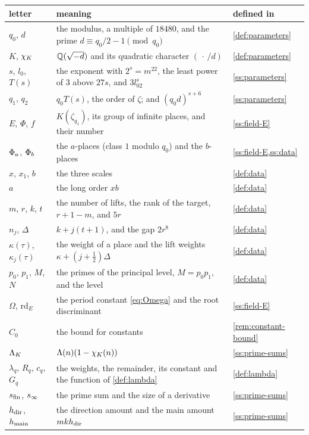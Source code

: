 \begin{longtable}{@{}>{\raggedright\arraybackslash}p{}>{\raggedright\arraybackslash}p{}>{\raggedright\arraybackslash}p{}@{}}
\toprule
letter & meaning & defined in\\
\midrule\endhead
$q_0$, $d$ & the modulus, a multiple of $18480$, and the prime $d\equiv q_0/2-1\pmod{q_0}$ & \cref{def:parameters}\\
$K$, $\chi_K$ & $\mathbb{Q}(\sqrt{-d})$ and its quadratic character $(\,\cdot\,/d)$ & \cref{def:parameters}\\
$s$, $l_0$, $T(s)$ & the exponent with $2^s=m^{22}$, the least power of $3$ above $27s$, and $3l_02^s$ & \cref{ss:parameters}\\
$q_1$, $q_2$ & $q_0T(s)$, the order of $\zeta$; and $(q_0d)^{s+6}$ & \cref{ss:parameters}\\
$E$, $\Phi$, $f$ & $K(\zeta_{q_1})$, its group of infinite places, and their number & \cref{ss:field-E}\\
$\Phi_a$, $\Phi_b$ & the $a$-places (class $1$ modulo $q_0$) and the $b$-places & \cref{ss:field-E,ss:data}\\
$x$, $x_1$, $b$ & the three scales & \cref{def:data}\\
$a$ & the long order $xb$ & \cref{def:data}\\
$m$, $r$, $k$, $t$ & the number of lifts, the rank of the target, $r+1-m$, and $5r$ & \cref{def:data}\\
$n_j$, $\Delta$ & $k+j(t+1)$, and the gap $2r^8$ & \cref{def:data}\\
$\kappa(\tau)$, $\kappa_j(\tau)$ & the weight of a place and the lift weights $\kappa+(j+\frac12)\Delta$ & \cref{def:data}\\
$p_0$, $p_1$, $M$, $N$ & the primes of the principal level, $M=p_0p_1$, and the level & \cref{def:data}\\
$\Omega$, $\mathrm{rd}_E$ & the period constant \eqref{eq:Omega} and the root discriminant & \cref{ss:field-E}\\
$C_0$ & the bound for constants & \cref{rem:constant-bound}\\
$\Lambda_K$ & $\Lambda(n)(1-\chi_K(n))$ & \cref{ss:prime-sums}\\
$\lambda_q$, $R_q$, $c_q$, $G_q$ & the weights, the remainder, its constant and the function of \cref{def:lambda} & \cref{def:lambda}\\
$s_{\mathrm{fin}}$, $s_\infty$ & the prime sum and the size of a derivative & \cref{ss:prime-sums}\\
$h_{\mathrm{dir}}$, $h_{\mathrm{main}}$ & the direction amount and the main amount $mkh_{\mathrm{dir}}$ & \cref{ss:prime-sums}\\

\end{longtable}
